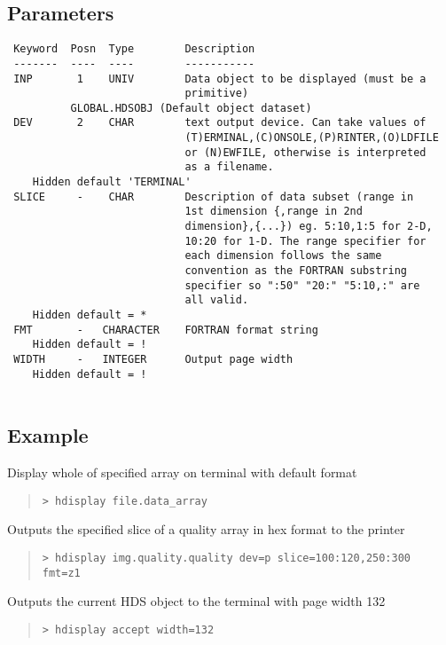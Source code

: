 \documentclass{book}
\renewcommand{\_}{{\tt\char'137}}     %
\begin{document}
\subsection{Parameters}
\begin{verbatim}
 Keyword  Posn  Type        Description
 -------  ----  ----        -----------
 INP       1    UNIV        Data object to be displayed (must be a
                            primitive)
          GLOBAL.HDSOBJ (Default object dataset)
 DEV       2    CHAR        text output device. Can take values of
                            (T)ERMINAL,(C)ONSOLE,(P)RINTER,(O)LDFILE
                            or (N)EWFILE, otherwise is interpreted
                            as a filename.
    Hidden default 'TERMINAL'
 SLICE     -    CHAR        Description of data subset (range in
                            1st dimension {,range in 2nd
                            dimension},{...}) eg. 5:10,1:5 for 2-D,
                            10:20 for 1-D. The range specifier for
                            each dimension follows the same
                            convention as the FORTRAN substring
                            specifier so ":50" "20:" "5:10,:" are
                            all valid.
    Hidden default = *
 FMT       -   CHARACTER    FORTRAN format string
    Hidden default = !
 WIDTH     -   INTEGER      Output page width
    Hidden default = !
 
\end{verbatim}\subsection{Example}
Display whole of specified array on terminal with default format
\begin{quote}\begin{verbatim}
> hdisplay file.data_array
\end{verbatim}\end{quote}
Outputs the specified slice of a
quality array in hex format to the printer
\begin{quote}\begin{verbatim}
> hdisplay img.quality.quality dev=p slice=100:120,250:300 fmt=z1
\end{verbatim}\end{quote}
Outputs the current HDS object to the terminal with page width 132
\begin{quote}\begin{verbatim}
> hdisplay accept width=132
\end{verbatim}\end{quote}
\end{document}
